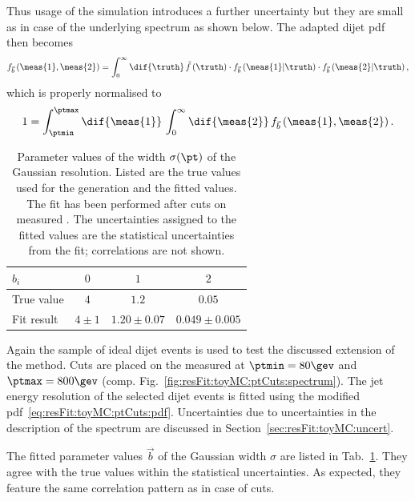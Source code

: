 \documentclass[a4paper]{cmspaper} %
\begin{document}
Thus usage of the simulation introduces a further uncertainty but they
are small as in case of the underlying spectrum as shown below.
The adapted dijet pdf then becomes
\begin{equation}
  \label{eq:resFit:toyMC:ptCuts:pdf}
  f_{\vec{b}}\left(\meas{1},\meas{2}\right) = \int^{\infty}_{0}\dif{\truth}\,\tilde{f}\left(\truth\right)
  \cdot f_{\vec{b}}\left(\meas{1}|\truth\right)
  \cdot f_{\vec{b}}\left(\meas{2}|\truth\right),
\end{equation}
which is properly normalised to
\begin{equation*}
  1 = \int^{\ptmax}_{\ptmin}\dif{\meas{1}}\,\int^{\infty}_{0}\dif{\meas{2}}\, f_{\vec{b}}\left(\meas{1},\meas{2}\right).
\end{equation*}

\begin{table}[ht]
  \centering
  \begin{tabular}[ht]{lccc}
    \hline \hline
    $b_{i}$ & $0$ & $1$ & $2$ \\
    \hline
    True value & $4$           & $1.2$                   & $0.05$ \\
    Fit result   & $4 \pm 1$ & $1.20 \pm 0.07$ & $0.049 \pm 0.005$ \\
    \hline \hline
  \end{tabular}
  \caption{Parameter values of the width $\sigma(\pt)$ of the Gaussian
    resolution. Listed are the true values used for the generation and
    the fitted values. The fit has been performed after cuts on measured \pt.
    The uncertainties assigned to the fitted values
    are the statistical uncertainties from the fit; correlations are not shown.}
  \label{tab:resFit:toyMC:ptCuts:fitResult}
\end{table}

Again the sample of ideal dijet events is used to test the discussed extension of the method.
Cuts are placed on the measured \pt at \mbox{$\ptmin = 80\gev$} and \mbox{$\ptmax = 800\gev$} (comp. Fig.~\ref{fig:resFit:toyMC:ptCuts:spectrum}).
The jet energy resolution of the selected dijet events is fitted using the modified pdf~\eqref{eq:resFit:toyMC:ptCuts:pdf}.
Uncertainties due to uncertainties in the description of the spectrum are discussed in Section~\ref{sec:resFit:toyMC:uncert}.

The fitted parameter values $\vec{b}$ of the Gaussian width $\sigma$ are listed in Tab.~\ref{tab:resFit:toyMC:ptCuts:fitResult}.
They agree with the true values within the statistical uncertainties.
As expected, they feature the same correlation pattern as in case of \pttrue cuts.
\end{document}

